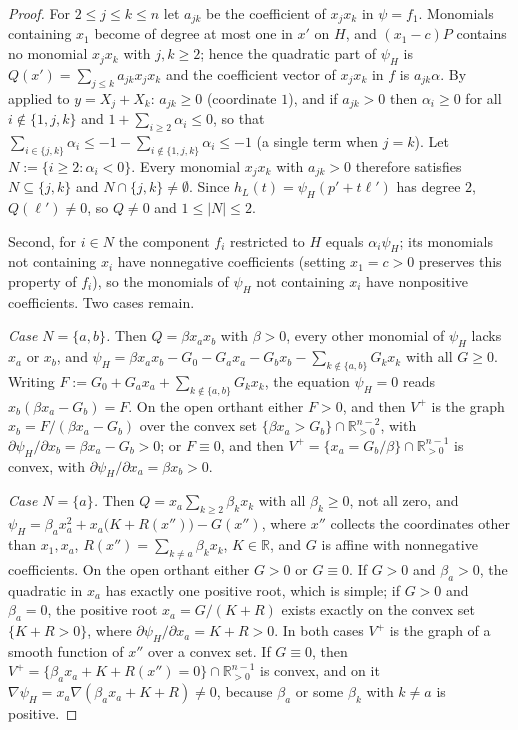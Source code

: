 \documentclass[11pt,a4paper]{report}
\providecommand{\R}{\mathbb{R}}
\newcommand{\Rpos}{\mathbb{R}_{>0}}
\newcommand{\Vp}{V^{+}}
\begin{document}
\begin{proof}
For $2\le j\le k\le n$ let $a_{jk}$ be the coefficient of $x_jx_k$ in $\psi=f_1$. Monomials containing $x_1$ become
of degree at most one in $x'$ on $H$, and $(x_1-c)P$ contains no monomial $x_jx_k$ with $j,k\ge2$; hence the
quadratic part of $\psi_H$ is $Q(x')=\sum_{j\le k}a_{jk}x_jx_k$ and the coefficient vector of $x_jx_k$ in $f$ is
$a_{jk}\alpha$. By  applied to $y=X_j+X_k$: $a_{jk}\ge0$ (coordinate $1$), and if $a_{jk}>0$ then
$\alpha_i\ge0$ for all $i\notin\{1,j,k\}$ and $1+\sum_{i\ge2}\alpha_i\le 0$, so that
$\sum_{i\in\{j,k\}}\alpha_i\le -1-\sum_{i\notin\{1,j,k\}}\alpha_i\le -1$ (a single term when $j=k$). Let
$N:=\{i\ge2\colon\alpha_i<0\}$. Every monomial
$x_jx_k$ with $a_{jk}>0$ therefore satisfies $N\subseteq\{j,k\}$ and $N\cap\{j,k\}\neq\emptyset$. Since
$h_L(t)=\psi_H(p'+t\ell')$ has degree $2$, $Q(\ell')\ne0$, so $Q\neq0$ and $1\le|N|\le2$.

Second, for $i\in N$ the component $f_i$ restricted to $H$ equals $\alpha_i\psi_H$; its monomials not containing
$x_i$ have nonnegative coefficients (setting $x_1=c>0$ preserves this property of $f_i$), so the monomials of
$\psi_H$ not containing $x_i$ have nonpositive coefficients. Two cases remain.

\emph{Case $N=\{a,b\}$.} Then $Q=\beta x_ax_b$ with $\beta>0$, every other monomial of $\psi_H$ lacks $x_a$ or $x_b$,
and $\psi_H=\beta x_ax_b-G_0-G_ax_a-G_bx_b-\sum_{k\notin\{a,b\}}G_kx_k$ with all $G\ge0$. Writing
$F:=G_0+G_ax_a+\sum_{k\notin\{a,b\}}G_kx_k$, the equation $\psi_H=0$ reads $x_b(\beta x_a-G_b)=F$. On the open
orthant either $F>0$, and then $\Vp$ is the graph $x_b=F/(\beta x_a-G_b)$ over the convex set
$\{\beta x_a>G_b\}\cap\Rpos^{n-2}$, with $\partial\psi_H/\partial x_b=\beta x_a-G_b>0$; or $F\equiv0$, and then
$\Vp=\{x_a=G_b/\beta\}\cap\Rpos^{n-1}$ is convex, with $\partial\psi_H/\partial x_a=\beta x_b>0$.

\emph{Case $N=\{a\}$.} Then $Q=x_a\sum_{k\ge2}\beta_kx_k$ with all $\beta_k\ge0$, not all zero, and
$\psi_H=\beta_ax_a^2+x_a\bigl(K+R(x'')\bigr)-G(x'')$, where $x''$ collects the coordinates other than $x_1,x_a$,
$R(x'')=\sum_{k\neq a}\beta_kx_k$, $K\in\R$, and $G$ is affine with nonnegative coefficients. On the open orthant
either $G>0$ or $G\equiv0$. If $G>0$ and $\beta_a>0$, the quadratic in $x_a$ has exactly one positive root, which is
simple; if $G>0$ and $\beta_a=0$, the positive root $x_a=G/(K+R)$ exists exactly on the convex set $\{K+R>0\}$, where
$\partial\psi_H/\partial x_a=K+R>0$. In both cases $\Vp$ is the graph of a smooth function of $x''$ over a convex set.
If $G\equiv0$, then $\Vp=\{\beta_ax_a+K+R(x'')=0\}\cap\Rpos^{n-1}$ is convex, and on it
$\nabla\psi_H=x_a\nabla(\beta_ax_a+K+R)\neq0$, because $\beta_a$ or some $\beta_k$ with $k\ne a$ is positive.
\end{proof}
\end{document}
